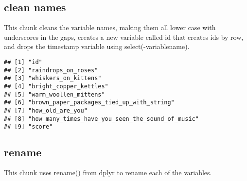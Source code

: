 \documentclass[]{article}
\newenvironment{Shaded}{\begin{snugshade}}{\end{snugshade}}
\newcommand{\CommentTok}[1]{\textcolor[rgb]{0.56,0.35,0.01}{\textit{#1}}}
\newcommand{\DataTypeTok}[1]{\textcolor[rgb]{0.13,0.29,0.53}{#1}}
\newcommand{\KeywordTok}[1]{\textcolor[rgb]{0.13,0.29,0.53}{\textbf{#1}}}
\newcommand{\NormalTok}[1]{#1}
\newcommand{\OperatorTok}[1]{\textcolor[rgb]{0.81,0.36,0.00}{\textbf{#1}}}
\newcommand{\StringTok}[1]{\textcolor[rgb]{0.31,0.60,0.02}{#1}}
\begin{document}
\hypertarget{clean-names}{%
\subsection{clean names}\label{clean-names}}

This chunk cleans the variable names, making them all lower case with
underscores in the gaps, creates a new variable called id that creates
ids by row, and drops the timestamp variable using
select(-variablename).

\begin{Shaded}
\end{Shaded}

\begin{verbatim}
## [1] "id"                                             
## [2] "raindrops_on_roses"                             
## [3] "whiskers_on_kittens"                            
## [4] "bright_copper_kettles"                          
## [5] "warm_woollen_mittens"                           
## [6] "brown_paper_packages_tied_up_with_string"       
## [7] "how_old_are_you"                                
## [8] "how_many_times_have_you_seen_the_sound_of_music"
## [9] "score"
\end{verbatim}

\hypertarget{rename}{%
\subsection{rename}\label{rename}}

This chunk uses rename() from dplyr to rename each of the variables.

\begin{Shaded}
\end{Shaded}
\end{document}

